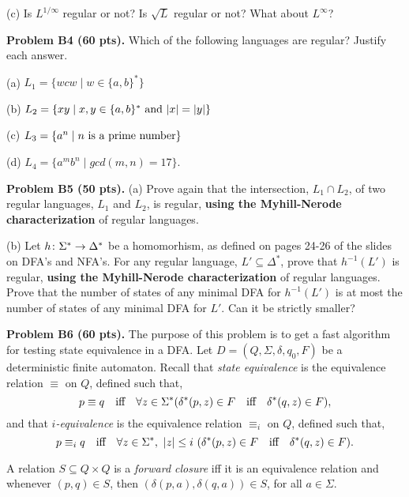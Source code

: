 \documentclass[12pt]{article}
\begin{document}
\medskip
(c) Is $L^{1/\infty}$ regular or not?
Is $\sqrt{L}$ regular or not?
What about $L^{\infty}$?



\vspace {0.25cm}\noindent
{\bf Problem B4 (60 pts).} 
Which of the following languages are regular? Justify
each answer.

\medskip
(a) $L_{1}=\{wcw \mid w\in \{a,b\}^{*}\}$

\medskip
(b) $L_{2}=\{xy \mid  x,y\in \{a,b\}^{*}\ \hbox{and}\  |x| = |y|\}$

\medskip
(c) $L_{3}=\{a^{n} \mid n\  \hbox{is a prime number}\}$

\medskip
(d) $L_{4} = \{a^mb^n \mid gcd(m, n) = 17\}$.



\vspace {0.25cm}\noindent
{\bf Problem B5 (50 pts).} 
(a) Prove again that the intersection,
$L_1\cap L_2$, of two regular languages, $L_1$ and $L_2$,
is regular, {\bf using the Myhill-Nerode characterization\/}
of regular languages.

\medskip
(b)
Let  $h\colon \Sigma^*\rightarrow \Delta^*$ be a homomorhism,
as defined on pages 24-26 of the slides on
DFA's and NFA's.
For any regular language, $L' \subseteq \Delta^*$,
prove that $h^{-1}(L')$ is regular,
{\bf using the Myhill-Nerode characterization\/}
of regular languages. Prove that the number of states
of any minimal DFA for $h^{-1}(L')$ is at most 
the number of states
of any minimal DFA for $L'$. Can it be strictly smaller?




\vspace{0.25cm}\noindent
{\bf Problem B6 (60 pts).} 
The purpose of this problem is to get a fast
algorithm for testing state equivalence in a DFA.
Let $D=(Q,\Sigma,\delta,q_{0},F)$ be a deterministic finite
automaton. Recall that {\it state equivalence\/} is the equivalence
relation $\equiv$ on $Q$, defined  such that,
$$p \equiv q\quad \hbox{iff}\quad \forall z\in\Sigma^* 
(\delta^{*}(p,z) \in F\quad \hbox{iff}\quad \delta^{*}(q,z) \in F),$$
and that {\it $i$-equivalence\/} is the equivalence
relation $\equiv_{i}$ on $Q$, defined such that,
$$p \equiv_{i} q\quad \hbox{iff}\quad \forall z\in\Sigma^*,\ |z| \leq i\ 
(\delta^{*}(p,z) \in F\quad \hbox{iff}\quad \delta^{*}(q,z) \in F).$$

\medskip
A relation $S\subseteq Q\times Q$ is a {\it forward closure\/} iff 
it is an equivalence relation and
whenever $(p, q)\in S$, then $(\delta(p, a), \delta(q, a))\in S$,
for all $a\in\Sigma$.
\end{document}
